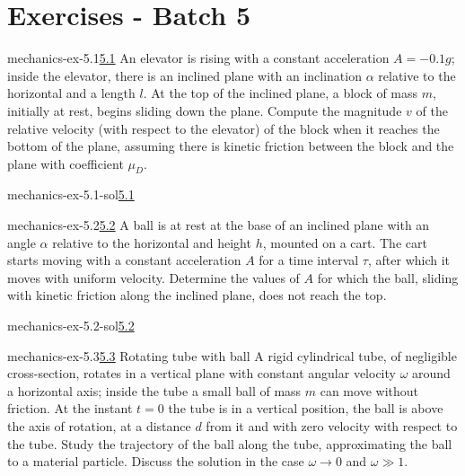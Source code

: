 \documentclass[preview]{standalone}
\begin{document}
\genpage

\section{Exercises - Batch 5}

\begin{snippetexercise}{mechanics-ex-5.1}{\underline{5.1}}
    An elevator is rising with a constant acceleration \( A = -0.1g \); inside the elevator, there is an inclined plane with an inclination \( \alpha \) relative to the horizontal and a length \( l \). At the top of the inclined plane, a block of mass \( m \), initially at rest, begins sliding down the plane. Compute the magnitude \( v \) of the relative velocity (with respect to the elevator) of the block when it reaches the bottom of the plane, assuming there is kinetic friction between the block and the plane with coefficient \( \mu_D \).
\end{snippetexercise}

\begin{snippetsolution}{mechanics-ex-5.1-sol}{\underline{5.1}}
    \todo
\end{snippetsolution}

\begin{snippetexercise}{mechanics-ex-5.2}{\underline{5.2}}
    A ball is at rest at the base of an inclined plane with an angle \( \alpha \) relative to the horizontal and height \( h \), mounted on a cart. The cart starts moving with a constant acceleration \( A \) for a time interval \( \tau \), after which it moves with uniform velocity. Determine the values of \( A \) for which the ball, sliding with kinetic friction along the inclined plane, does not reach the top.
\end{snippetexercise}

\begin{snippetsolution}{mechanics-ex-5.2-sol}{\underline{5.2}}
    \todo
\end{snippetsolution}

\begin{snippetexercise}{mechanics-ex-5.3}{\underline{5.3} Rotating tube with ball}
    A rigid cylindrical tube, of negligible cross-section, rotates in a vertical plane with constant angular velocity
    \(\omega\) around a horizontal axis; inside the tube a small ball of mass \(m\) can move without friction.
    At the instant \(t=0\) the tube is in a vertical position, the ball is above the axis of rotation,
    at a distance \(d\) from it and with zero velocity with respect to the tube.
    Study the trajectory of the ball along the tube, approximating the ball to a material particle.
    Discuss the solution in the case
    \(\omega \to 0\) and \(\omega \gg 1\).
\end{snippetexercise}
\end{document}
